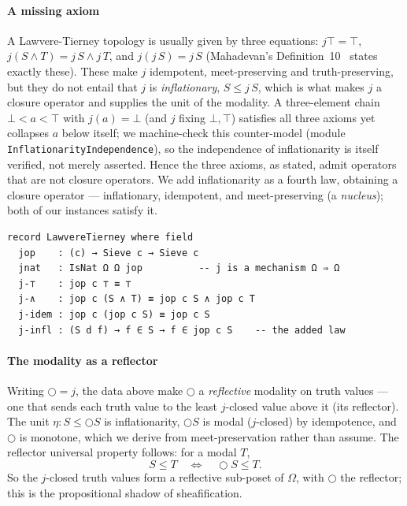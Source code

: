 \documentclass{lmcs}
\newcommand{\Om}{\Omega}
\newcommand{\cl}{\bigcirc}
\begin{document}
\paragraph{A missing axiom}
A Lawvere-Tierney topology is usually given by three equations: $j\top = \top$, $j(S \wedge T) = j\,S \wedge j\,T$, and $j(j\,S) = j\,S$ (Mahadevan's Definition~10~\cite{mahadevan-2025b} states exactly these).
These make $j$ idempotent, meet-preserving and truth-preserving, but they do not entail that $j$ is \emph{inflationary}, $S \le j\,S$, which is what makes $j$ a closure operator and supplies the unit of the modality.
A three-element chain $\bot < a < \top$ with $j(a) = \bot$ (and $j$ fixing $\bot, \top$) satisfies all three axioms yet collapses $a$ below itself; we machine-check this counter-model (module \texttt{InflationarityIndependence}), so the independence of inflationarity is itself verified, not merely asserted.
Hence the three axioms, as stated, admit operators that are not closure operators.
We add inflationarity as a fourth law, obtaining a closure operator --- inflationary, idempotent, and meet-preserving (a \emph{nucleus}); both of our instances satisfy it.
\begin{lstlisting}
record LawvereTierney where field
  jop    : (c) → Sieve c → Sieve c
  jnat   : IsNat Ω Ω jop          -- j is a mechanism Ω ⇒ Ω
  j-⊤    : jop c ⊤ ≡ ⊤
  j-∧    : jop c (S ∧ T) ≡ jop c S ∧ jop c T
  j-idem : jop c (jop c S) ≡ jop c S
  j-infl : (S d f) → f ∈ S → f ∈ jop c S    -- the added law
\end{lstlisting}

\paragraph{The modality as a reflector}
Writing $\cl = j$, the data above make $\cl$ a \emph{reflective} modality on truth values --- one that sends each truth value to the least $j$-closed value above it (its reflector). The unit $\eta : S \le \cl S$ is inflationarity, $\cl S$ is modal ($j$-closed) by idempotence, and $\cl$ is monotone, which we derive from meet-preservation rather than assume.
The reflector universal property follows: for a modal $T$,
\[ S \le T \quad\Longleftrightarrow\quad \cl S \le T. \]
So the $j$-closed truth values form a reflective sub-poset of $\Om$, with $\cl$ the reflector; this is the propositional shadow of sheafification.
\end{document}
